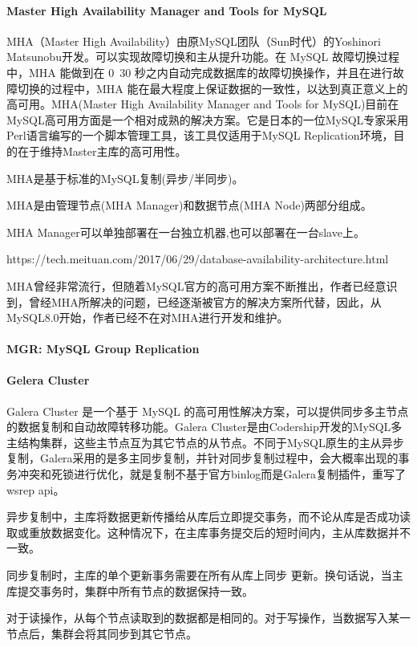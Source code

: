 \documentclass[../../../interview-questions.tex]{subfiles}
\begin{document}
\paragraph{Master High Availability Manager and Tools for MySQL}

MHA（Master High Availability）由原MySQL团队（Sun时代）的Yoshinori Matsunobu开发。可以实现故障切换和主从提升功能。在 MySQL 故障切换过程中，MHA 能做到在 0~30 秒之内自动完成数据库的故障切换操作，并且在进行故障切换的过程中，MHA 能在最大程度上保证数据的一致性，以达到真正意义上的高可用。MHA(Master High Availability Manager and Tools for MySQL)目前在MySQL高可用方面是一个相对成熟的解决方案。它是日本的一位MySQL专家采用Perl语言编写的一个脚本管理工具，该工具仅适用于MySQL Replication环境，目的在于维持Master主库的高可用性。

MHA是基于标准的MySQL复制(异步/半同步)。

MHA是由管理节点(MHA Manager)和数据节点(MHA Node)两部分组成。

MHA Manager可以单独部署在一台独立机器,也可以部署在一台slave上。

https://tech.meituan.com/2017/06/29/database-availability-architecture.html

MHA曾经非常流行，但随着MySQL官方的高可用方案不断推出，作者已经意识到，曾经MHA所解决的问题，已经逐渐被官方的解决方案所代替，因此，从MySQL8.0开始，作者已经不在对MHA进行开发和维护。

\paragraph{MGR: MySQL Group Replication}


\paragraph{Gelera Cluster}

Galera Cluster 是一个基于 MySQL 的高可用性解决方案，可以提供同步多主节点的数据复制和自动故障转移功能。Galera Cluster是由Codership开发的MySQL多主结构集群，这些主节点互为其它节点的从节点。不同于MySQL原生的主从异步复制，Galera采用的是多主同步复制，并针对同步复制过程中，会大概率出现的事务冲突和死锁进行优化，就是复制不基于官方binlog而是Galera复制插件，重写了wsrep api。

异步复制中，主库将数据更新传播给从库后立即提交事务，而不论从库是否成功读取或重放数据变化。这种情况下，在主库事务提交后的短时间内，主从库数据并不一致。

同步复制时，主库的单个更新事务需要在所有从库上同步 更新。换句话说，当主库提交事务时，集群中所有节点的数据保持一致。

对于读操作，从每个节点读取到的数据都是相同的。对于写操作，当数据写入某一节点后，集群会将其同步到其它节点。
\end{document}
